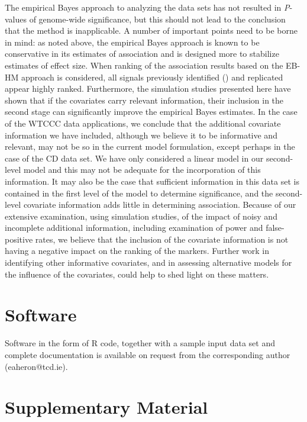 \documentclass[oupdraft]{bio}
\begin{document}
The empirical Bayes approach to analyzing the
\citet{Gichangi_Vach:2006}
data sets has not resulted in \textit{P}-values of genome-wide
significance, but this should not lead to the conclusion
that the method is inapplicable. A number of important
points need to be borne in mind: as noted above, the
empirical Bayes approach is known to be conservative in
its estimates of association and is designed more to
stabilize estimates of effect size. When ranking of the
association results based on the EB-HM approach is
considered, all signals previously identified
(\citealp{Barlow_Bartholomew:1972})
and replicated appear highly ranked. Furthermore, the
simulation studies presented here have shown that if
the covariates carry relevant information, their
inclusion in the second stage can significantly improve
the empirical Bayes estimates. In the case of the WTCCC
data applications, we conclude that the additional
covariate information we have included, although we believe
it to be informative and relevant, may not be so in the
current model formulation, except perhaps in the case
of the CD data set. We have only considered a linear model
in our second-level model and this may not be adequate for
the incorporation of this information. It may also be the
case that sufficient information in this data set is
contained in the first level of the model to determine
significance, and the second-level covariate information
adds little in determining association. Because of our
extensive examination, using simulation studies, of the
impact of noisy and incomplete additional information,
including examination of power and false-positive rates,
we believe that the inclusion of the covariate information
is not having a negative impact on the ranking of the
markers. Further work in identifying other informative
covariates, and in assessing alternative models for the
influence of the covariates, could help to shed light on
these matters.


\section{Software}
\label{sec5}

Software in the form of R code, together with a sample
input data set and complete documentation is available on
request from the corresponding author (eaheron@tcd.ie).


\section{Supplementary Material}
\label{sec6}
\end{document}
